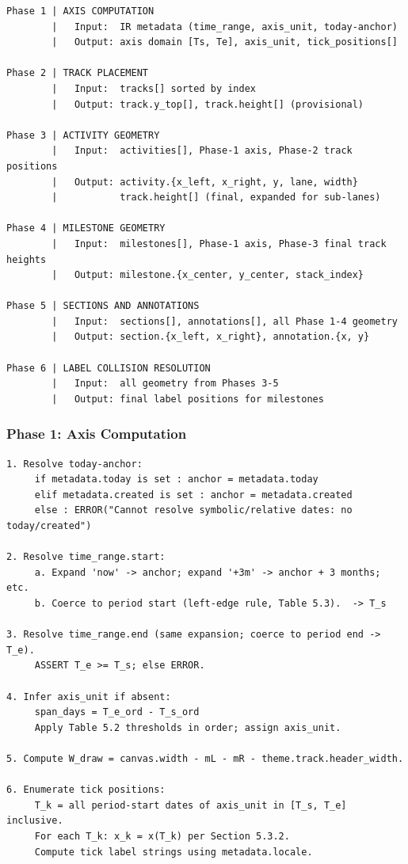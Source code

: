 \begin{lstlisting}[caption={Layout pipeline overview}]
Phase 1 | AXIS COMPUTATION
        |   Input:  IR metadata (time_range, axis_unit, today-anchor)
        |   Output: axis domain [Ts, Te], axis_unit, tick_positions[]

Phase 2 | TRACK PLACEMENT
        |   Input:  tracks[] sorted by index
        |   Output: track.y_top[], track.height[] (provisional)

Phase 3 | ACTIVITY GEOMETRY
        |   Input:  activities[], Phase-1 axis, Phase-2 track positions
        |   Output: activity.{x_left, x_right, y, lane, width}
        |           track.height[] (final, expanded for sub-lanes)

Phase 4 | MILESTONE GEOMETRY
        |   Input:  milestones[], Phase-1 axis, Phase-3 final track heights
        |   Output: milestone.{x_center, y_center, stack_index}

Phase 5 | SECTIONS AND ANNOTATIONS
        |   Input:  sections[], annotations[], all Phase 1-4 geometry
        |   Output: section.{x_left, x_right}, annotation.{x, y}

Phase 6 | LABEL COLLISION RESOLUTION
        |   Input:  all geometry from Phases 3-5
        |   Output: final label positions for milestones
\end{lstlisting}

\subsubsection{Phase 1: Axis Computation}
\label{sec:phase1}

\begin{lstlisting}[caption={Phase 1: Axis computation}]
1. Resolve today-anchor:
     if metadata.today is set : anchor = metadata.today
     elif metadata.created is set : anchor = metadata.created
     else : ERROR("Cannot resolve symbolic/relative dates: no today/created")

2. Resolve time_range.start:
     a. Expand 'now' -> anchor; expand '+3m' -> anchor + 3 months; etc.
     b. Coerce to period start (left-edge rule, Table 5.3).  -> T_s

3. Resolve time_range.end (same expansion; coerce to period end -> T_e).
     ASSERT T_e >= T_s; else ERROR.

4. Infer axis_unit if absent:
     span_days = T_e_ord - T_s_ord
     Apply Table 5.2 thresholds in order; assign axis_unit.

5. Compute W_draw = canvas.width - mL - mR - theme.track.header_width.

6. Enumerate tick positions:
     T_k = all period-start dates of axis_unit in [T_s, T_e] inclusive.
     For each T_k: x_k = x(T_k) per Section 5.3.2.
     Compute tick label strings using metadata.locale.
\end{lstlisting}

